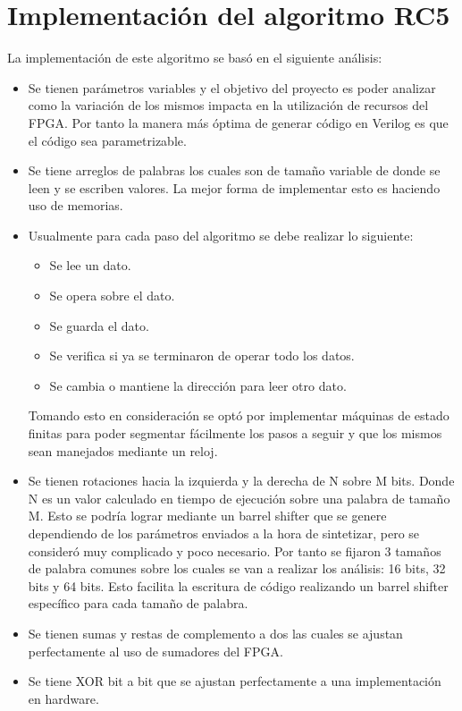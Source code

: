 \section{Implementación del algoritmo RC5}
La implementación de este algoritmo se basó en el siguiente análisis:
\begin{itemize}
\item Se tienen parámetros variables y el objetivo del proyecto es poder analizar como la variación de los mismos impacta en la utilización de recursos del FPGA. Por tanto la manera más óptima de generar código en Verilog es que el código sea parametrizable.

\item Se tiene arreglos de palabras los cuales son de tamaño variable de donde se leen y se escriben valores. La mejor forma de implementar esto es haciendo uso de memorias.

\item Usualmente para cada paso del algoritmo se debe realizar lo siguiente:
\begin{itemize}
\item Se lee un dato.
\item Se opera sobre el dato.
\item Se guarda el dato.
\item Se verifica si ya se terminaron de operar todo los datos.
\item Se cambia o mantiene la dirección para leer otro dato.
\end{itemize}
Tomando esto en consideración se optó por implementar máquinas de estado finitas para poder segmentar fácilmente los pasos a seguir y que los mismos sean manejados mediante un reloj.

\item Se tienen rotaciones hacia la izquierda y la derecha de N sobre M bits. Donde N es un valor calculado en tiempo de ejecución sobre una palabra de tamaño M. Esto se podría lograr mediante un barrel shifter que se genere dependiendo de los parámetros enviados a la hora de sintetizar, pero se consideró muy complicado y poco necesario. Por tanto se fijaron 3 tamaños de palabra comunes sobre los cuales se van a realizar los análisis: 16 bits, 32 bits y 64 bits. Esto facilita la escritura de código realizando un barrel shifter específico para cada tamaño de palabra. 

\item Se tienen sumas y restas de complemento a dos las cuales se ajustan perfectamente al uso de sumadores del FPGA.

\item Se tiene XOR bit a bit que se ajustan perfectamente a una implementación en hardware.
\end{itemize}

